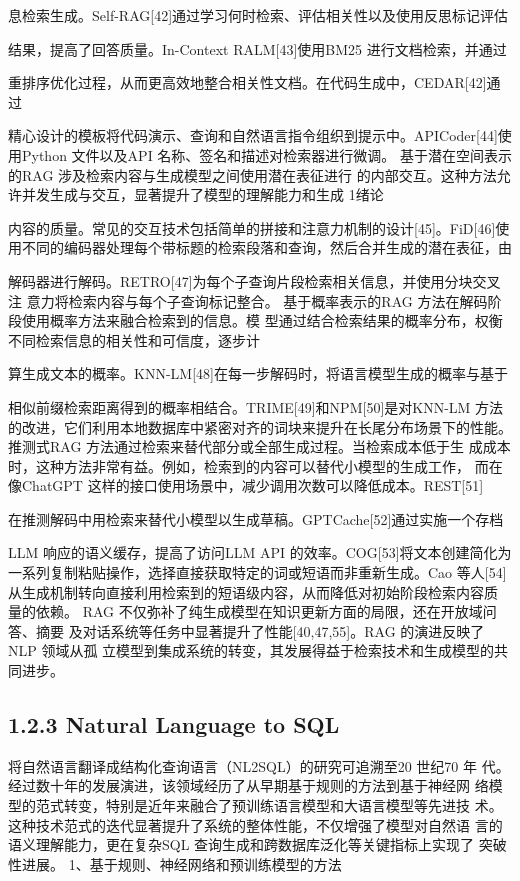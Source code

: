 \documentclass[12pt,a4paper,openright,UTF8]{ctexbook}
\begin{document}
息检索生成。Self-RAG[42]通过学习何时检索、评估相关性以及使用反思标记评估

结果，提高了回答质量。In-Context RALM[43]使用BM25 进行文档检索，并通过

重排序优化过程，从而更高效地整合相关性文档。在代码生成中，CEDAR[42]通过

精心设计的模板将代码演示、查询和自然语言指令组织到提示中。APICoder[44]使 用Python 文件以及API 名称、签名和描述对检索器进行微调。 基于潜在空间表示的RAG 涉及检索内容与生成模型之间使用潜在表征进行 的内部交互。这种方法允许并发生成与交互，显著提升了模型的理解能力和生成 1绪论

内容的质量。常见的交互技术包括简单的拼接和注意力机制的设计[45]。FiD[46]使 用不同的编码器处理每个带标题的检索段落和查询，然后合并生成的潜在表征，由

解码器进行解码。RETRO[47]为每个子查询片段检索相关信息，并使用分块交叉注 意力将检索内容与每个子查询标记整合。 基于概率表示的RAG 方法在解码阶段使用概率方法来融合检索到的信息。模 型通过结合检索结果的概率分布，权衡不同检索信息的相关性和可信度，逐步计

算生成文本的概率。KNN-LM[48]在每一步解码时，将语言模型生成的概率与基于

相似前缀检索距离得到的概率相结合。TRIME[49]和NPM[50]是对KNN-LM 方法 的改进，它们利用本地数据库中紧密对齐的词块来提升在长尾分布场景下的性能。 推测式RAG 方法通过检索来替代部分或全部生成过程。当检索成本低于生 成成本时，这种方法非常有益。例如，检索到的内容可以替代小模型的生成工作， 而在像ChatGPT 这样的接口使用场景中，减少调用次数可以降低成本。REST[51]

在推测解码中用检索来替代小模型以生成草稿。GPTCache[52]通过实施一个存档

LLM 响应的语义缓存，提高了访问LLM API 的效率。COG[53]将文本创建简化为 一系列复制粘贴操作，选择直接获取特定的词或短语而非重新生成。Cao 等人[54] 从生成机制转向直接利用检索到的短语级内容，从而降低对初始阶段检索内容质 量的依赖。 RAG 不仅弥补了纯生成模型在知识更新方面的局限，还在开放域问答、摘要 及对话系统等任务中显著提升了性能[40,47,55]。RAG 的演进反映了NLP 领域从孤 立模型到集成系统的转变，其发展得益于检索技术和生成模型的共同进步。

\subsection{1.2.3 Natural Language to SQL}

将自然语言翻译成结构化查询语言（NL2SQL）的研究可追溯至20 世纪70 年 代。经过数十年的发展演进，该领域经历了从早期基于规则的方法到基于神经网 络模型的范式转变，特别是近年来融合了预训练语言模型和大语言模型等先进技 术。这种技术范式的迭代显著提升了系统的整体性能，不仅增强了模型对自然语 言的语义理解能力，更在复杂SQL 查询生成和跨数据库泛化等关键指标上实现了 突破性进展。 1、基于规则、神经网络和预训练模型的方法
\end{document}
